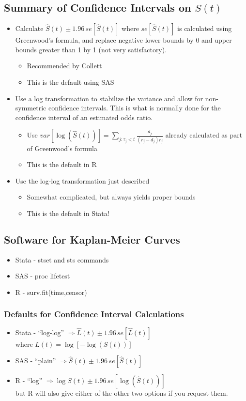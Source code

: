 \documentclass[11pt,slidesonly,semrot,portrait,palatino]{book}
\begin{document}
\subsection{Summary of Confidence Intervals on $S(t)$}
\begin{itemize}
\item Calculate $\hat{S}(t) \pm 1.96 \, se[\hat{S}(t)]$
where $se[\hat{S}(t)]$ is calculated using Greenwood's formula,
and replace negative lower bounds by 0 and upper bounds greater than 1
by 1 (not very satisfactory).
\begin{itemize}
\item Recommended by Collett
\item This is the default using SAS
\end{itemize}
\item Use a log transformation to stabilize the variance and allow for
non-symmetric confidence intervals.  This is what is normally done for
the confidence interval of an estimated odds ratio.
\begin{itemize}
\item Use $var[\log(\hat{S}(t))] =
\sum_{j: \tau_j < t} \frac{d_j}{(r_j-d_j) r_j}$
already calculated as part of Greenwood's formula
\item This is the default in R
\end{itemize}
\item Use the log-log transformation just described
\begin{itemize}
\item Somewhat complicated, but always yields proper bounds
\item This is the default in Stata!
\end{itemize}
\end{itemize}
\normalsize


\subsection{Software for Kaplan-Meier Curves}
\begin{itemize}
\item  Stata - stset and sts commands
\item  SAS  - {\sc proc lifetest}
\item  R - surv.fit(time,censor)
\end{itemize}
\subsubsection{Defaults for Confidence Interval Calculations}
\begin{itemize}
\item Stata - ``log-log'' $\Rightarrow \hat{L}(t) \pm 1.96 \,
se[\hat{L}(t)]$ \\
where $L(t) = \log[-\log(S(t))]$
\item SAS - ``plain'' $\Rightarrow \hat{S}(t) \pm 1.96\,
se[\hat{S}(t)]$
\item R - ``log'' $\Rightarrow \log{S}(t) \pm 1.96 \,
se[\log(\hat{S}(t))]$\\
but R will also give either of the other two options
if you request them.
\end{itemize}
\end{document}
